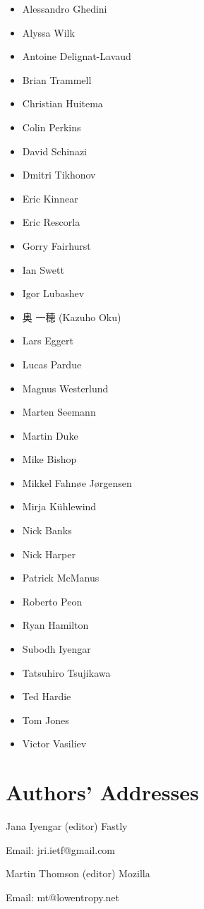 \documentclass{article}
\begin{document}
\begin{itemize}
\item Alessandro Ghedini
\item Alyssa Wilk
\item Antoine Delignat-Lavaud
\item Brian Trammell
\item Christian Huitema
\item Colin Perkins
\item David Schinazi
\item Dmitri Tikhonov
\item Eric Kinnear
\item Eric Rescorla
\item Gorry Fairhurst
\item Ian Swett
\item Igor Lubashev
\item 奥 一穂 (Kazuho Oku)
\item Lars Eggert
\item Lucas Pardue
\item Magnus Westerlund
\item Marten Seemann
\item Martin Duke
\item Mike Bishop
\item Mikkel Fahnøe Jørgensen
\item Mirja Kühlewind
\item Nick Banks
\item Nick Harper
\item Patrick McManus
\item Roberto Peon
\item Ryan Hamilton
\item Subodh Iyengar
\item Tatsuhiro Tsujikawa
\item Ted Hardie
\item Tom Jones
\item Victor Vasiliev
\end{itemize}
\section*{Authors' Addresses}

Jana Iyengar (editor) Fastly

Email: jri.ietf@gmail.com

Martin Thomson (editor) Mozilla

Email: mt@lowentropy.net
\end{document}
